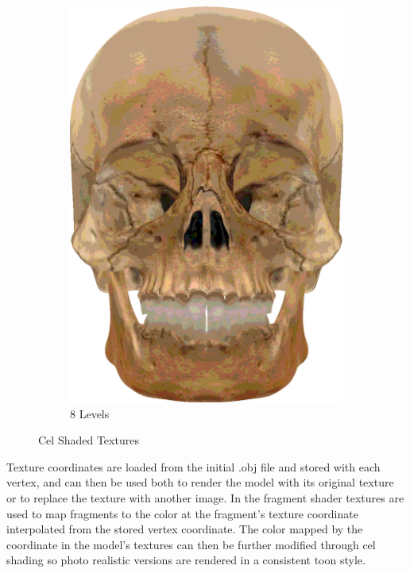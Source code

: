 \begin{figure}[h]
\begin{subfigure}[b]{0.18\textwidth}
        \includegraphics[width=\textwidth]{img/textures/CelShadeTexture8Skull.png}
        \caption{8 Levels}
        \label{fig:CelShadeTexture8Skull}
    \end{subfigure}
    \caption{Cel Shaded Textures}
    \label{fig:TexturesEngineer}
\end{figure}

Texture coordinates are loaded from the initial .obj file and stored with each vertex, and can then be used both to render the model with its original texture or to replace the texture with another image. In the fragment shader textures are used to map fragments to the color at the fragment's texture coordinate interpolated from the stored vertex coordinate. The color mapped by the coordinate in the model's textures can then be further modified through cel shading so photo realistic versions are rendered in a consistent toon style.

